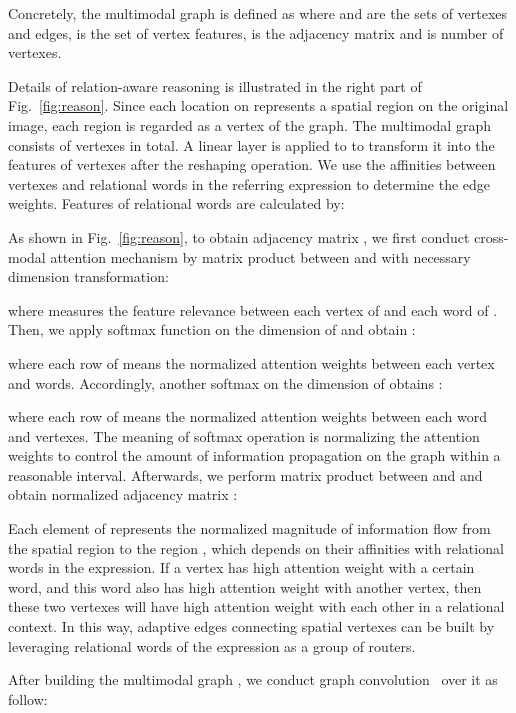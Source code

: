 \documentclass[10pt,journal,cspaper,compsoc]{IEEEtran}
\begin{document}
Concretely, the multimodal graph is defined as  where  and  are the sets of vertexes and edges,  is the set of vertex features,  is the adjacency matrix and  is number of vertexes. 

Details of relation-aware reasoning is illustrated in the right part of Fig.~\ref{fig:reason}. 
Since each location on  represents a spatial region on the original image, each region is regarded as a vertex of the graph. 
The multimodal graph consists of  vertexes in total.
A linear layer is applied to  to transform it into the features of vertexes  after the reshaping operation. 
We use the affinities between vertexes and relational words in the referring expression to determine the edge weights. 
Features of relational words  are calculated by:


As shown in Fig.~\ref{fig:reason}, to obtain adjacency matrix , we first conduct cross-modal attention mechanism by matrix product between  and  with necessary dimension transformation: 

where  measures the feature relevance between each vertex of  and each word of . 
Then, we apply softmax function on the  dimension of  and obtain : 

where each row of  means the normalized  attention weights between each vertex and  words. 
Accordingly, another softmax on the  dimension of  obtains : 

where each row of  means the normalized  attention weights between each word and  vertexes. The meaning of softmax operation is normalizing the attention weights to control the amount of information propagation on the graph within a reasonable interval.
Afterwards, we perform matrix product between  and  and obtain normalized adjacency matrix : 
 


Each element  of  represents the normalized magnitude of information flow from the spatial region  to the region , which depends on their affinities with relational words in the expression. If a vertex has high attention weight with a certain word, and this word also has high attention weight with another vertex, then these two vertexes will have high attention weight with each other in a relational context.
In this way, adaptive edges connecting spatial vertexes can be built by leveraging relational words of the expression as a group of routers.

After building the multimodal graph , we conduct graph convolution~\cite{kipf2016semi} over it as follow:
\end{document}
